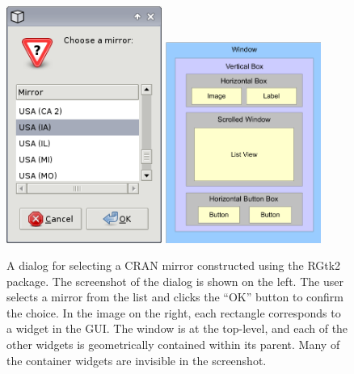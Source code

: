 \documentclass[article]{jss}
\begin{document}
\begin{figure}[bhp]
\begin{center}
\includegraphics[width=2in]{cran-mirror.png}
\hspace{.5in}
\includegraphics[width=2in]{widget-hierarchy.pdf}
\caption{\label{fig:cran-mirror}\label{fig:widget-hierarchy} A dialog
  for selecting a CRAN mirror constructed using the RGtk2 package. The
  screenshot of the dialog is shown on the left. The user selects a
  mirror from the list and clicks the ``OK'' button to confirm the
  choice.  In the image on the right, each rectangle corresponds to a
  widget in the GUI. The window is at the top-level, and each of the
  other widgets is geometrically contained within its parent. Many of
  the container widgets are invisible in the screenshot.}
\end{center}
\end{figure}

\end{document}
